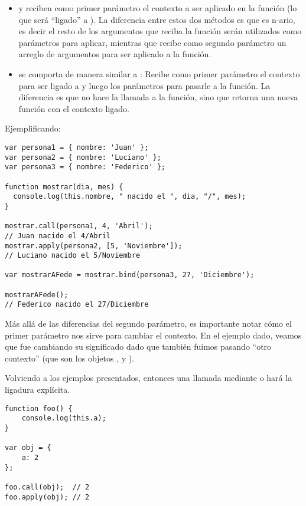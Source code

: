 \begin{itemize}
\item {} y  reciben como primer parámetro el contexto a ser aplicado en la función (lo que será "`ligado"' a ). La diferencia entre estos dos métodos es que  es n-ario, es decir el resto de los argumentos que reciba la función serán utilizados como parámetros para aplicar, mientras que  recibe como segundo parámetro un arreglo de argumentos para ser aplicado a la función.
\item {} se comporta de manera similar a : Recibe como primer parámetro el contexto para ser ligado a  y luego los parámetros para pasarle a la función. La diferencia es que  no hace la llamada a la función, sino que retorna una nueva función con el contexto ligado.
\end{itemize}

Ejemplificando:

\begin{lstlisting}[title={\code{call}, \code{apply} y \code{bind} en acción}]
var persona1 = { nombre: 'Juan' };
var persona2 = { nombre: 'Luciano' };
var persona3 = { nombre: 'Federico' };

function mostrar(dia, mes) {
  console.log(this.nombre, " nacido el ", dia, "/", mes);
}

mostrar.call(persona1, 4, 'Abril');
// Juan nacido el 4/Abril
mostrar.apply(persona2, [5, 'Noviembre']);
// Luciano nacido el 5/Noviembre

var mostrarAFede = mostrar.bind(persona3, 27, 'Diciembre');

mostrarAFede();
// Federico nacido el 27/Diciembre
\end{lstlisting}

Más allá de las diferencias del segundo parámetro, es importante notar cómo el primer parámetro nos sirve para cambiar el contexto. En el ejemplo dado, veamos que  fue cambiando su significado dado que también fuimos pasando "`otro contexto"' (que son los objetos ,  y ).

Volviendo a los ejemplos presentados, entonces una llamada mediante  o  hará la ligadura explícita.

\begin{lstlisting}[title={Ligadura explícita}]
function foo() {
	console.log(this.a);
}

var obj = {
	a: 2
};

foo.call(obj); 	// 2
foo.apply(obj);	// 2
\end{lstlisting}


